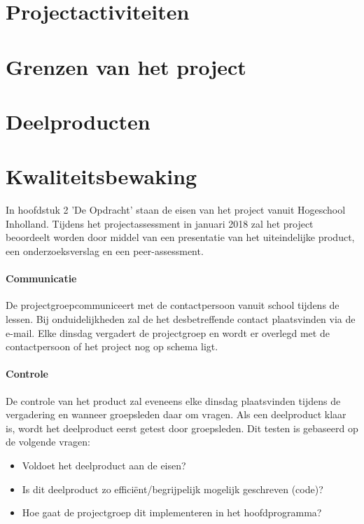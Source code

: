 \documentclass[11pt]{article}
\begin{document}
\section{Projectactiviteiten}
\newpage
\section[Grenzen] {Grenzen van het project}
\newpage
\section{Deelproducten}
\newpage
\section{Kwaliteitsbewaking}

	

\begin{flushleft}
In hoofdstuk 2 'De Opdracht' staan de eisen van het project vanuit Hogeschool Inholland. Tijdens het projectassessment in januari 2018 zal het project beoordeelt worden door middel van een presentatie van het uiteindelijke product, een onderzoeksverslag en een peer-assessment.
\end{flushleft}
\paragraph{Communicatie}
\begin{flushleft}
De projectgroepcommuniceert met de contactpersoon vanuit school tijdens de lessen. Bij onduidelijkheden zal de het desbetreffende contact plaatsvinden via de e-mail. Elke dinsdag vergadert de projectgroep en wordt er overlegd met de contactpersoon of het project nog op schema ligt. 
\end{flushleft}
\paragraph{Controle}
\begin{flushleft}
De controle van het product zal eveneens elke dinsdag plaatsvinden tijdens de vergadering en wanneer groepsleden daar om vragen. Als een deelproduct klaar is, wordt het deelproduct eerst getest door groepsleden. Dit testen is gebaseerd op de volgende vragen:
\begin{itemize}
	\item Voldoet het deelproduct aan de eisen?
	\item Is dit deelproduct zo efficiënt/begrijpelijk mogelijk geschreven (code)?
	\item Hoe gaat de projectgroep dit implementeren in het hoofdprogramma?
\end{itemize}
\end{flushleft}
\end{document}
